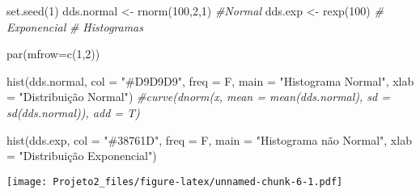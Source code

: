 \documentclass[
]{article}
\newenvironment{Shaded}{\begin{snugshade}}{\end{snugshade}}
\newcommand{\AttributeTok}[1]{\textcolor[rgb]{0.77,0.63,0.00}{#1}}
\newcommand{\CommentTok}[1]{\textcolor[rgb]{0.56,0.35,0.01}{\textit{#1}}}
\newcommand{\DecValTok}[1]{\textcolor[rgb]{0.00,0.00,0.81}{#1}}
\newcommand{\FunctionTok}[1]{\textcolor[rgb]{0.00,0.00,0.00}{#1}}
\newcommand{\NormalTok}[1]{#1}
\newcommand{\OtherTok}[1]{\textcolor[rgb]{0.56,0.35,0.01}{#1}}
\newcommand{\StringTok}[1]{\textcolor[rgb]{0.31,0.60,0.02}{#1}}
\begin{document}
\begin{Shaded}
\begin{Highlighting}[]
  \FunctionTok{set.seed}\NormalTok{(}\DecValTok{1}\NormalTok{)}
\NormalTok{    dds.normal }\OtherTok{\textless{}{-}} \FunctionTok{rnorm}\NormalTok{(}\DecValTok{100}\NormalTok{,}\DecValTok{2}\NormalTok{,}\DecValTok{1}\NormalTok{) }\CommentTok{\#Normal}
\NormalTok{    dds.exp }\OtherTok{\textless{}{-}} \FunctionTok{rexp}\NormalTok{(}\DecValTok{100}\NormalTok{)  }\CommentTok{\# Exponencial }
    \CommentTok{\# Histogramas}

    \FunctionTok{par}\NormalTok{(}\AttributeTok{mfrow=}\FunctionTok{c}\NormalTok{(}\DecValTok{1}\NormalTok{,}\DecValTok{2}\NormalTok{))}

    \FunctionTok{hist}\NormalTok{(dds.normal, }
         \AttributeTok{col =} \StringTok{"\#D9D9D9"}\NormalTok{,}
         \AttributeTok{freq =}\NormalTok{ F, }
         \AttributeTok{main =} \StringTok{"Histograma Normal"}\NormalTok{, }\AttributeTok{xlab =} \StringTok{"Distribuição Normal"}\NormalTok{)}
    \CommentTok{\#curve(dnorm(x, mean = mean(dds.normal), sd = sd(dds.normal)), add = T)}

    \FunctionTok{hist}\NormalTok{(dds.exp,}
         \AttributeTok{col =} \StringTok{"\#38761D"}\NormalTok{,}
         \AttributeTok{freq =}\NormalTok{ F, }
         \AttributeTok{main =} \StringTok{"Histograma não Normal"}\NormalTok{, }\AttributeTok{xlab =} \StringTok{"Distribuição Exponencial"}\NormalTok{)}
\end{Highlighting}
\end{Shaded}

\texttt{[image: Projeto2\_files/figure-latex/unnamed-chunk-6-1.pdf]}
\end{document}
